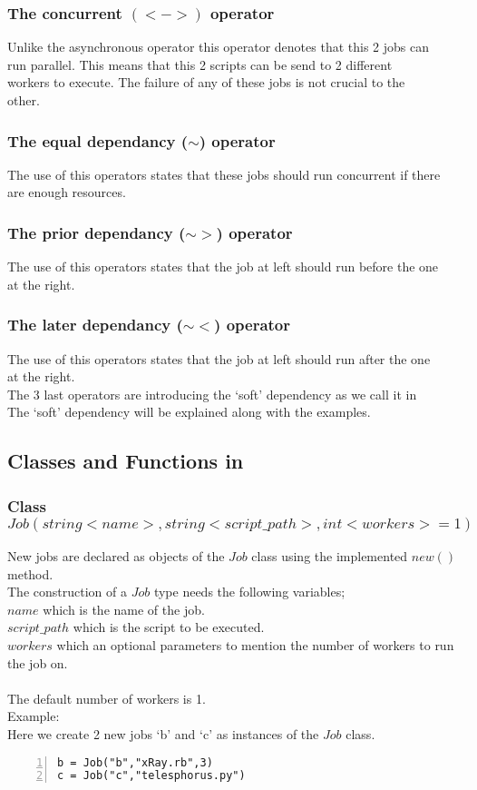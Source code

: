 \subsubsection*{The concurrent $(<->)$ operator}
Unlike the asynchronous operator this operator denotes that this 2 jobs can\\
run parallel. This means that this 2 scripts can be send to 2 different\\
workers to execute. The failure of any of these jobs is not crucial to the\\
other.
\subsubsection*{The equal dependancy ($\sim$) operator}
The use of this operators states that these jobs should run concurrent if there\\
are enough resources.
\subsubsection*{The prior dependancy ($\sim>$) operator}
The use of this operators states that the job at left should run before the one\\
at the right.
\subsubsection*{The later dependancy ($\sim<$) operator}
The use of this operators states that the job at left should run after the one\\
at the right.\\
The 3 last operators are introducing the `soft' dependency as we call it in \lang{}\\
The `soft' dependency will be explained along with the examples.\\
\subsection*{Classes and Functions in \lang{}}
\subsubsection*{Class $Job(string <name>, string <script\_path>, int <workers>=1)$}
New jobs are declared as objects of the $Job$ class using the implemented $new()$ method.\\
The construction of a $Job$ type needs the following variables;\\
$name$ which is the name of the job.\\
$script\_path$ which is the script to be executed.\\
$workers$ which an optional parameters to mention the number of workers to run the job on.\\\\
The default number of workers is 1.\\
Example:\\
Here we create 2 new jobs `b' and `c' as instances of the $Job$ class.
\begin{Verbatim}[numbers=left]
b = Job("b","xRay.rb",3)
c = Job("c","telesphorus.py")
\end{Verbatim}
